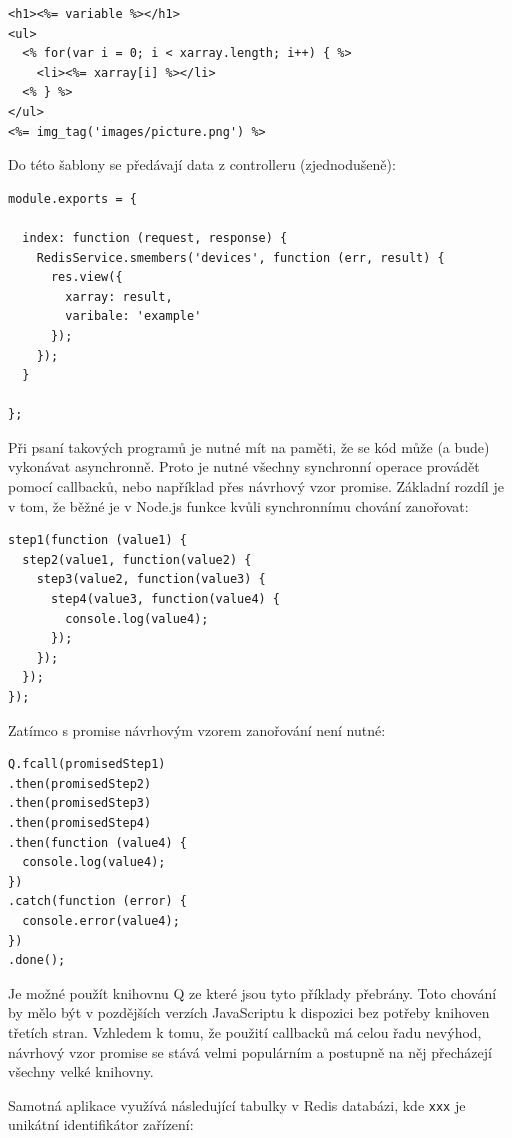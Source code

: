 \begin{verbatim}
<h1><%= variable %></h1>
<ul>
  <% for(var i = 0; i < xarray.length; i++) { %>
    <li><%= xarray[i] %></li>
  <% } %>
</ul>
<%= img_tag('images/picture.png') %>
\end{verbatim}

Do této šablony se předávají data z controlleru (zjednodušeně):

\begin{verbatim}
module.exports = {

  index: function (request, response) {
    RedisService.smembers('devices', function (err, result) {
      res.view({
        xarray: result,
        varibale: 'example'
      });
    });
  }

};
\end{verbatim}

Při psaní takových programů je nutné mít na paměti, že se kód může (a bude) vykonávat asynchronně. Proto je nutné všechny synchronní operace provádět pomocí callbacků, nebo například přes návrhový vzor promise.  Základní rozdíl je v tom, že běžné je v Node.js funkce kvůli synchronnímu chování zanořovat:

\begin{verbatim}
step1(function (value1) {
  step2(value1, function(value2) {
    step3(value2, function(value3) {
      step4(value3, function(value4) {
        console.log(value4);
      });
    });
  });
});
\end{verbatim}

Zatímco s promise návrhovým vzorem zanořování není nutné:

\begin{verbatim}
Q.fcall(promisedStep1)
.then(promisedStep2)
.then(promisedStep3)
.then(promisedStep4)
.then(function (value4) {
  console.log(value4);
})
.catch(function (error) {
  console.error(value4);
})
.done();
\end{verbatim}

Je možné použít knihovnu Q \cite{q} ze které jsou tyto příklady přebrány. Toto chování by mělo být v pozdějších verzích JavaScriptu k dispozici bez potřeby knihoven třetích stran. Vzhledem k tomu, že použití callbacků má celou řadu nevýhod, návrhový vzor promise se stává velmi populárním a postupně na něj přecházejí všechny velké knihovny.

Samotná aplikace využívá následující tabulky v Redis databázi, kde \texttt{xxx} je unikátní identifikátor zařízení: 


